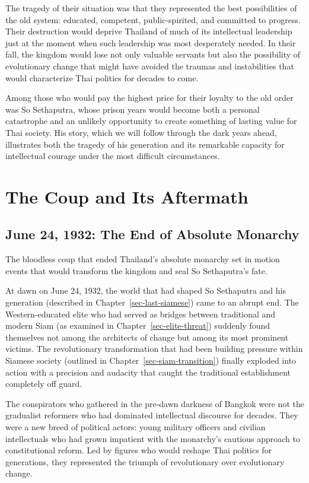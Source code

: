 \documentclass[
  Letterpaper,
]{scrbook}
\begin{document}
The tragedy of their situation was that they represented the best
possibilities of the old system: educated, competent, public-spirited,
and committed to progress. Their destruction would deprive Thailand of
much of its intellectual leadership just at the moment when such
leadership was most desperately needed. In their fall, the kingdom would
lose not only valuable servants but also the possibility of evolutionary
change that might have avoided the traumas and instabilities that would
characterize Thai politics for decades to come.

Among those who would pay the highest price for their loyalty to the old
order was So Sethaputra, whose prison years would become both a personal
catastrophe and an unlikely opportunity to create something of lasting
value for Thai society. His story, which we will follow through the dark
years ahead, illustrates both the tragedy of his generation and its
remarkable capacity for intellectual courage under the most difficult
circumstances.


\chapter{The Coup and Its Aftermath}\label{sec-coup-aftermath}

\section{June 24, 1932: The End of Absolute
Monarchy}\label{june-24-1932-the-end-of-absolute-monarchy}

The bloodless coup that ended Thailand's absolute monarchy set in motion
events that would transform the kingdom and seal So Sethaputra's fate.

At dawn on June 24, 1932, the world that had shaped So Sethaputra and
his generation (described in Chapter~\ref{sec-last-siamese}) came to an
abrupt end. The Western-educated elite who had served as bridges between
traditional and modern Siam (as examined in
Chapter~\ref{sec-elite-threat}) suddenly found themselves not among the
architects of change but among its most prominent victims. The
revolutionary transformation that had been building pressure within
Siamese society (outlined in Chapter~\ref{sec-siam-transition}) finally
exploded into action with a precision and audacity that caught the
traditional establishment completely off guard.

The conspirators who gathered in the pre-dawn darkness of Bangkok were
not the gradualist reformers who had dominated intellectual discourse
for decades. They were a new breed of political actors: young military
officers and civilian intellectuals who had grown impatient with the
monarchy's cautious approach to constitutional reform. Led by figures
who would reshape Thai politics for generations, they represented the
triumph of revolutionary over evolutionary change.
\end{document}
